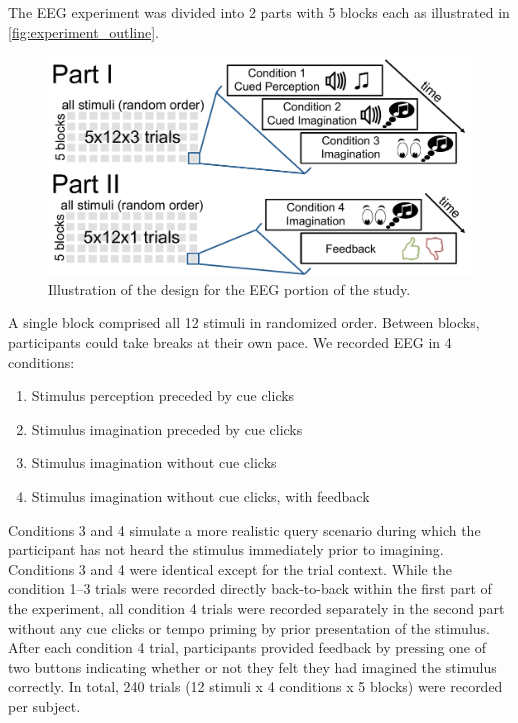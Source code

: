 The EEG experiment was divided into 2 parts with 5 blocks each as illustrated in \autoref{fig:experiment_outline}.
\begin{figure}[htbp]
  \begin{center}
    \includegraphics[scale=0.6]{Figures/study_design_small.pdf}
    \caption{%
Illustration of the design for the EEG portion of the study.
}
    \label{fig:experiment_outline}
  \end{center}
\end{figure}
A single block comprised all 12 stimuli in randomized order.
Between blocks, participants could take breaks at their own pace.
\newpage
We recorded EEG in 4 conditions:
\begin{enumerate}
\item
Stimulus perception preceded by cue clicks
\item
Stimulus imagination preceded by cue clicks
\item
Stimulus imagination without cue clicks
\item
Stimulus imagination without cue clicks, with feedback
\end{enumerate}

Conditions 3 and 4 simulate a more realistic query scenario during which the participant has not heard the stimulus immediately prior to imagining.
Conditions 3 and 4 were identical except for the trial context.
While the condition 1--3 trials were recorded directly back-to-back within the first part of the experiment, 
all condition 4 trials were recorded separately in the second part without any cue clicks or tempo priming by prior presentation of the stimulus.
After each condition 4 trial, participants provided feedback by pressing one of two buttons indicating whether or not they felt they had imagined the stimulus correctly.
In total, 240 trials (12 stimuli x 4 conditions x 5 blocks) were recorded per subject.

